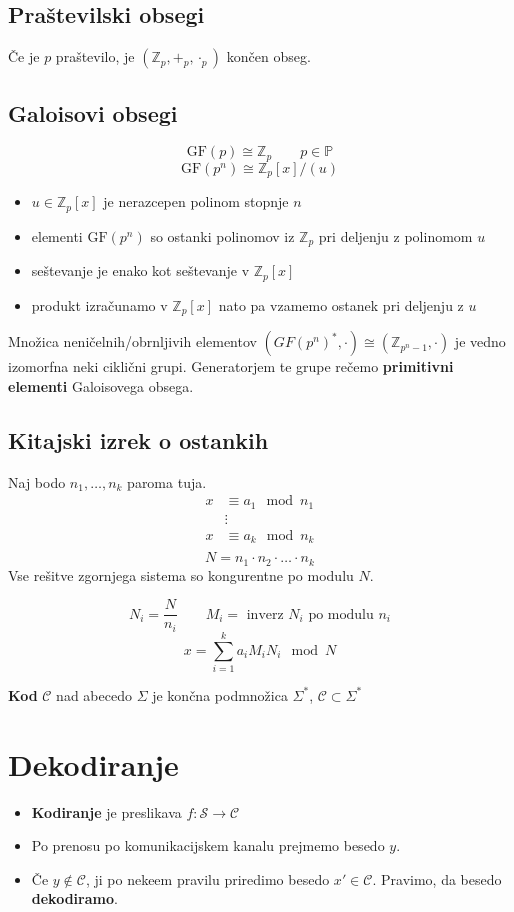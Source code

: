 \begin{multicols}{5}
\subsection*{Praštevilski obsegi}
Če je $p$ praštevilo, je $(\mathbb{Z}_p, +_p, \cdot_p)$ končen obseg.


\subsection*{Galoisovi obsegi}
\[\text{GF}(p) \cong \mathbb{Z}_p \qquad p \in \mathbb{P}\]
\[ \text{GF}(p^n) \cong \mathbb{Z}_p[x]/(u) \]
\begin{itemize}
	\item $u \in \mathbb{Z}_p[x]$ je nerazcepen polinom stopnje $n$
	\item elementi $\text{GF}(p^n)$ so ostanki polinomov iz $\mathbb{Z}_p$ pri deljenju z polinomom $u$
	\item seštevanje je enako kot seštevanje v $\mathbb{Z}_p[x]$
	\item produkt izračunamo v $\mathbb{Z}_p[x]$ nato pa vzamemo ostanek pri deljenju z $u$
\end{itemize}

Množica neničelnih/obrnljivih elementov $(GF(p^n)^*, \cdot) \cong (\mathbb{Z}_{p^n-1}, \cdot)$ je vedno izomorfna neki ciklični grupi.
Generatorjem te grupe rečemo \textbf{primitivni elementi} Galoisovega obsega.

\subsection*{Kitajski izrek o ostankih}
Naj bodo $n_1, \dots, n_k$ paroma tuja.
\begin{align*}
	x &\equiv a_1 \mod n_1 \\
	 & \vdots \\
	x &\equiv a_k \mod n_k \\
\end{align*}
\[ N = n_1 \cdot n_2 \cdot \dots \cdot n_k \]
Vse rešitve zgornjega sistema so kongurentne po modulu $N$.

\[ N_i = \frac{N}{n_i} \qquad M_i = \text{ inverz } N_i \text{ po modulu } n_i\]
\[x = \sum_{i=1}^{k} a_i M_i N_i \mod N\]
\newpage

\textbf{Kod} $\mathcal{C}$ nad abecedo $\Sigma$ je končna podmnožica $\Sigma^*$,
$\mathcal{C}\subset \Sigma^*$
\section{Dekodiranje}
\begin{itemize}
	\item \textbf{Kodiranje} je preslikava $f: \mathcal{S}\rightarrow\mathcal{C}$
	\item Po prenosu po komunikacijskem kanalu prejmemo besedo $y$.
	\item Če $y \notin \mathcal{C}$, ji po nekeem pravilu priredimo besedo
		$x\prime \in \mathcal{C}$. Pravimo, da besedo \textbf{dekodiramo}.
\end{itemize}

\end{multicols}
